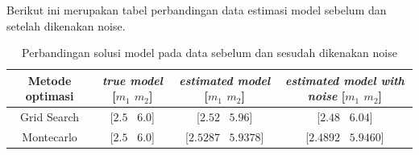 \documentclass{article}
\begin{document}
Berikut ini merupakan tabel perbandingan data estimasi model sebelum dan setelah dikenakan noise.
\begin{table}[h!]
    \centering
    \caption{Perbandingan solusi model pada data sebelum dan sesudah dikenakan noise}
      \begin{tabular}{cccc}
        \toprule
        {Metode optimasi} & {\textit{true model} [$m_1$ $m_2$]} & \textit{estimated model} [$m_1$ $m_2$] & \textit{estimated model with noise} [$m_1$ $m_2$] \\
   \midrule
      Grid Search & [$2.5$ \ $6.0$] & [$2.52$ \ $5.96$] & [$2.48$ \ $6.04$] \\
      Montecarlo & [$2.5$ \ $6.0$] & [$2.5287$ \ $5.9378$] & [$2.4892$ \ $5.9460$]\\
      \bottomrule
      \end{tabular}%
    \label{tab:bentuk geometri}%
\end{table}%
\end{document}

